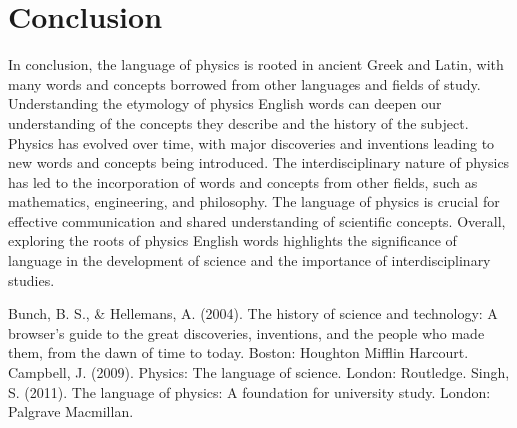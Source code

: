 \documentclass{phyasgn}\usepackage{nag}
\begin{document}
\section{Conclusion}
In conclusion, the language of physics is rooted in ancient Greek and Latin, with many words and concepts borrowed from other languages and fields of study. Understanding the etymology of physics English words can deepen our understanding of the concepts they describe and the history of the subject. Physics has evolved over time, with major discoveries and inventions leading to new words and concepts being introduced. The interdisciplinary nature of physics has led to the incorporation of words and concepts from other fields, such as mathematics, engineering, and philosophy. The language of physics is crucial for effective communication and shared understanding of scientific concepts. Overall, exploring the roots of physics English words highlights the significance of language in the development of science and the importance of interdisciplinary studies.
\begin{thebibliography}{99}
	Bunch, B. S., \& Hellemans, A. (2004). The history of science and technology: A browser's guide to the great discoveries, inventions, and the people who made them, from the dawn of time to today. Boston: Houghton Mifflin Harcourt.
    Campbell, J. (2009). Physics: The language of science. London: Routledge.
    Singh, S. (2011). The language of physics: A foundation for university study. London: Palgrave Macmillan.
\end{thebibliography}
\end{document}
